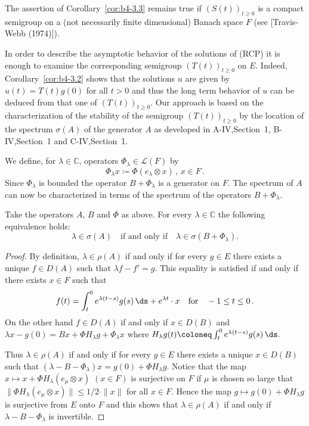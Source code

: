 The assertion of Corollary~\ref{cor:b4-3.3} remains true if $(S(t))_{t \geq 0}$ is a compact semigroup on a (not necessarily finite dimensional) Banach space $F$ (see [Travis-Webb (1974)]).

In order to describe the asymptotic behavior of the solutions of (RCP) it is enough to examine the corresponding semigroup $(T(t))_{t \geq 0}$ on $E$. Indeed, Corollary~\ref{cor:b4-3.2} shows that the solutions $u$ are given by $u(t) = T(t)g(0)$ for all $t > 0$ and thus the long term behavior of $u$ can be deduced from that one of $(T(t))_{t \geq 0}$. Our approach is based on the characterization of the stability of the semigroup $(T(t))_{t \geq 0}$ by the location of the spectrum $\sigma(A)$ of the generator $A$ as developed in A-IV,Section~1, B-IV,Section~1 and C-IV,Section~1.

We define, for $\lambda \in \mathbb{C}$, operators $\Phi_\lambda \in \mathcal{L}(F)$ by
\begin{equation}\label{eq:b4-3.3}
	\Phi_\lambda x  \coloneq  \Phi(e_\lambda \otimes x) \, , \, x \in F \, .
\end{equation}
Since $\Phi_\lambda$ is bounded the operator $B + \Phi_\lambda$ is a generator on $F$. The spectrum of $A$ can now be characterized in terms of the spectrum of the operators $B + \Phi_\lambda$.
%
%
%
\newpage
%
\begin{proposition}\label{prop:b4-3.4}
	Take the operators $A$, $B$ and $\Phi$ as above. For every $\lambda \in \mathbb{C}$ the following equivalence holds:
	\begin{equation}\label{eq:b4-3.4}
		\lambda \in \sigma(A) \quad \text{if and only if} \quad \lambda \in \sigma(B + \Phi_\lambda).
	\end{equation}
\end{proposition}

\begin{proof} By definition, $\lambda \in \rho(A)$ if and only if for every $g \in E$ there exists a unique $f \in D(A)$ such that $\lambda f - f' = g$. This equality is satisfied if and only if there exists $x \in F$ such that
\[
f(t) = \int_t^0 e^{\lambda(t-s)} g(s) \,\ds + e^{\lambda t} \cdot x \quad \text{for} \quad -1 \leq t \leq 0  \,.
\]
On the other hand $f \in D(A)$ if and only if $x \in D(B)$ and $\lambda x - g(0) = Bx + \Phi H_\lambda g + \Phi_\lambda x$ where $H_\lambda g(t) \coloneq  \int_t^0 e^{\lambda(t-s)} g(s) \,\ds \text{.}$

Thus $\lambda \in \rho(A)$ if and only if for every $g \in E$ there exists a unique $x \in D(B)$ such that $(\lambda - B - \Phi_\lambda)x = g(0) + \Phi H_\lambda g$. Notice that the map $x \mapsto x + \Phi H_\lambda(e_\mu \otimes x)$ $(x \in F)$ is surjective on $F$ if $\mu$ is chosen so large that $\|\Phi H_\lambda(e_\mu \otimes x)\| \leq 1/2 \cdot \|x\|$ for all $x \in F$. Hence the map $g \mapsto g(0) + \Phi H_\lambda g$ is surjective from $E$ onto $F$ and this shows that $\lambda \in \rho(A)$ if and only if $\lambda - B - \Phi_\lambda$ is invertible.
\end{proof}

